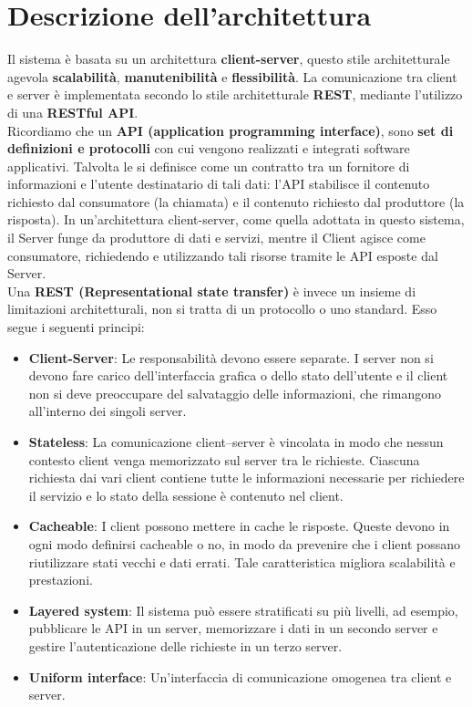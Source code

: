 \section{Descrizione dell'architettura}

Il sistema è basata su un architettura \textbf{client-server}, questo stile architetturale agevola \textbf{scalabilità}, \textbf{manutenibilità} e \textbf{flessibilità}.
La comunicazione tra client e server è implementata secondo lo stile architetturale \textbf{REST}, mediante l’utilizzo di una \textbf{RESTful API}.
\\
Ricordiamo che un \textbf{API (application programming interface)}, sono \textbf{set
di definizioni e protocolli} con cui vengono realizzati e integrati software applicativi. Talvolta le si definisce come un contratto tra un fornitore di informazioni e l’utente destinatario
di tali dati: l’API stabilisce il contenuto richiesto dal consumatore (la chiamata) e il contenuto
richiesto dal produttore (la risposta). In un’architettura client-server, come quella adottata in
questo sistema, il Server funge da produttore di dati e servizi, mentre il Client agisce come
consumatore, richiedendo e utilizzando tali risorse tramite le API esposte dal Server.
\\
Una \textbf{REST (Representational state transfer)} è invece un insieme di limitazioni architetturali, non si tratta di un protocollo o uno standard. 
Esso segue i seguenti principi:

\begin{itemize}
	\item \textbf{Client-Server}: Le responsabilità devono essere separate. I server non si devono fare carico dell'interfaccia grafica o dello stato dell'utente e il client non si deve preoccupare del salvataggio delle informazioni, che rimangono all'interno dei singoli server.
	\item \textbf{Stateless}: La comunicazione client–server è vincolata in modo che nessun contesto client venga memorizzato sul server tra le richieste. Ciascuna richiesta dai vari client contiene tutte le informazioni necessarie per richiedere il servizio e lo stato della sessione è contenuto nel client.
	\item \textbf{Cacheable}: I client possono mettere in cache le risposte. Queste devono in ogni modo definirsi cacheable o no, in modo da prevenire che i client possano riutilizzare stati vecchi e dati errati. Tale caratteristica migliora scalabilità e prestazioni.
	\item \textbf{Layered system}: Il sistema può essere stratificati su più livelli, ad esempio, pubblicare le API in un server, memorizzare i dati in un secondo server e gestire l'autenticazione delle richieste in un terzo server.
	\item \textbf{Uniform interface}: Un'interfaccia di comunicazione omogenea tra client e server.
\end{itemize}

